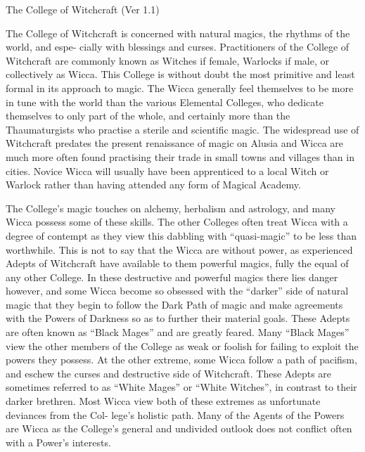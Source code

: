 \begin{Chapter}{The College of Witchcraft (Ver 1.1)}

The College of Witchcraft is concerned with natural magics, the
rhythms of the world, and espe- cially with blessings and curses.
Practitioners of the College of Witchcraft are commonly known as
Witches if female, Warlocks if male, or collectively as Wicca. This
College is without doubt the most primitive and least formal in its
approach to magic.  The Wicca generally feel themselves to be more in
tune with the world than the various Elemental Colleges, who dedicate
themselves to only part of the whole, and certainly more than the
Thaumaturgists who practise a sterile and scientific magic.  The
widespread use of Witchcraft predates the present renaissance of magic
on Alusia and Wicca are much more often found practising their trade
in small towns and villages than in cities.  Novice Wicca will usually
have been apprenticed to a local Witch or Warlock rather than having
attended any form of Magical Academy.

The College’s magic touches on alchemy, herbalism and astrology, and
many Wicca possess some of these skills.  The other Colleges often
treat Wicca with a degree of contempt as they view this dabbling with
“quasi-magic” to be less than worthwhile.  This is not to say that the
Wicca are without power, as experienced Adepts of Witchcraft have
available to them powerful magics, fully the equal of any other
College. In these destructive and powerful magics there lies danger
however, and some Wicca become so obsessed with the “darker” side of
natural magic that they begin to follow the Dark Path of magic and
make agreements with the Powers of Darkness so as to further their
material goals. These Adepts are often known as “Black Mages” and are
greatly feared.  Many “Black Mages” view the other members of the
College as weak or foolish for failing to exploit the powers they
possess.  At the other extreme, some Wicca follow a path of pacifism,
and eschew the curses and destructive side of Witchcraft.  These
Adepts are sometimes referred to as “White Mages” or “White Witches”,
in contrast to their darker brethren.  Most Wicca view both of these
extremes as unfortunate deviances from the Col- lege’s holistic path.
Many of the Agents of the Powers are Wicca as the College’s general
and undivided outlook does not conflict often with a Power’s
interests.


\end{Chapter}
